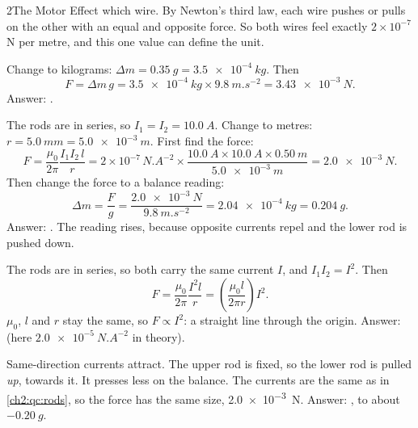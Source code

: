 \begin{chapteranswers}{2}{The Motor Effect}
        which wire. By Newton's third law, each wire pushes or pulls on the other with an equal and
        opposite force. So both wires feel exactly $2 \times 10^{-7}$ N per metre, and this one
        value can define the unit.
  \item Change to kilograms: $\Delta m = \qty{0.35}{g} = \qty{3.5e-4}{kg}$. Then
        \[ F = \Delta m\, g = \qty{3.5e-4}{kg} \times \qty{9.8}{m.s^{-2}} = \qty{3.43e-3}{N}. \]
        Answer: .
  \item The rods are in series, so $I_1 = I_2 = \qty{10.0}{A}$. Change to metres:
        $r = \qty{5.0}{mm} = \qty{5.0e-3}{m}$. First find the force:
        \[ F = \frac{\mu_0}{2\pi}\frac{I_1 I_2\, l}{r} = 2 \times 10^{-7}\,\unit{N.A^{-2}} \times
        \frac{\qty{10.0}{A} \times \qty{10.0}{A} \times \qty{0.50}{m}}{\qty{5.0e-3}{m}}
        = \qty{2.0e-3}{N}. \]
        Then change the force to a balance reading:
        \[ \Delta m = \frac{F}{g} = \frac{\qty{2.0e-3}{N}}{\qty{9.8}{m.s^{-2}}}
        = \qty{2.04e-4}{kg} = \qty{0.204}{g}. \]
        Answer: . The reading rises, because opposite currents
        repel and the lower rod is pushed down.
  \item The rods are in series, so both carry the same current $I$, and $I_1 I_2 = I^2$. Then
        \[ F = \frac{\mu_0}{2\pi}\frac{I^2 l}{r} = \left(\frac{\mu_0 l}{2\pi r}\right) I^2. \]
        $\mu_0$, $l$ and $r$ stay the same, so $F \propto I^2$: a straight line through the origin.
        Answer:  (here $\qty{2.0e-5}{N.A^{-2}}$ in theory).
  \item Same-direction currents attract. The upper rod is fixed, so the lower rod is pulled
        \emph{up}, towards it. It presses less on the balance. The currents are the same as in
        \cref{ch2:qc:rods}, so the force has the same size, \qty{2.0e-3}{N}. Answer: , to about $-\qty{0.20}{g}$.
\end{chapteranswers}
